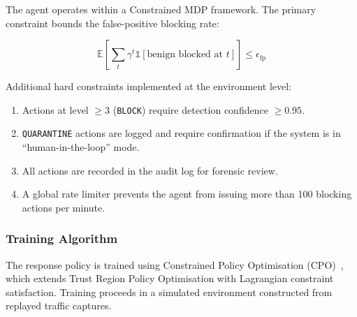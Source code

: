 \documentclass[12pt,a4paper]{article}
\theoremstyle{definition}
\begin{document}
The agent operates within a Constrained MDP framework.
The primary constraint bounds the false-positive blocking rate:

\begin{equation}
\mathbb{E}\left[\sum_{t} \gamma^t \mathbb{1}[\text{benign blocked at } t]\right] \leq \epsilon_{\text{fp}}
\end{equation}

Additional hard constraints implemented at the environment level:

\begin{enumerate}
\item Actions at level $\geq 3$ (\texttt{BLOCK}) require detection confidence $\geq 0.95$.
\item \texttt{QUARANTINE} actions are logged and require confirmation if the system is in ``human-in-the-loop'' mode.
\item All actions are recorded in the audit log for forensic review.
\item A global rate limiter prevents the agent from issuing more than 100 blocking actions per minute.
\end{enumerate}

\subsubsection{Training Algorithm}

The response policy is trained using Constrained Policy Optimisation (CPO)~\cite{achiam2017}, which extends Trust Region Policy Optimisation with Lagrangian constraint satisfaction.
Training proceeds in a simulated environment constructed from replayed traffic captures.
\end{document}
